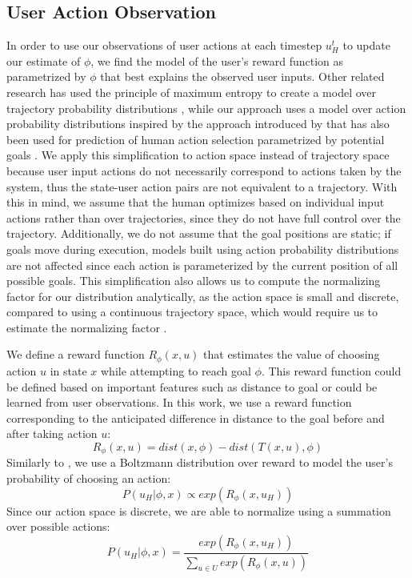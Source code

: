 \documentclass[conference]{IEEEtran}
\begin{document}
\subsection{User Action Observation}
In order to use our observations of user actions at each timestep $u_H^t$ to update our estimate of $\phi$, we find the model of the user's reward function as parametrized by $\phi$ that best explains the observed user inputs. Other related research has used the principle of maximum entropy \cite{ziebart2008maximum} to create a model over trajectory probability distributions \cite{dragan2012formalizing, javdani2015shared}, while our approach uses a model over action probability distributions inspired by the approach introduced by  \citet{ramachandran2007bayesian} that has also been used for prediction of human action selection parametrized by potential goals \cite{fisac2018probabilistically}. We apply this simplification to action space instead of trajectory space because user input actions do not necessarily correspond to actions taken by the system, thus the state-user action pairs are not equivalent to a trajectory. With this in mind, we assume that the human optimizes based on individual input actions rather than over trajectories, since they do not have full control over the trajectory. Additionally, we do not assume that the goal positions are static; if goals move during execution, models built using action probability distributions are not affected since each action is parameterized by the current position of all possible goals. This simplification also allows us to compute the normalizing factor for our distribution analytically, as the action space is small and discrete, compared to using a continuous trajectory space, which would require us to estimate the normalizing factor \cite{javdani2015shared}.

We define a reward function $R_\phi (x, u)$ that estimates the value of choosing action $u$ in state $x$ while attempting to reach goal $\phi$. This reward function could be defined based on important features such as distance to goal or could be learned from user observations. In this work, we use a reward function corresponding to the anticipated difference in distance to the goal before and after taking action $u$:
\[
R_\phi (x, u) = dist(x, \phi) - dist(T(x, u), \phi)
\]
Similarly to \citet{ramachandran2007bayesian}, we use a Boltzmann distribution over reward to model the user's probability of choosing an action:
\[
P(u_H|\phi, x) \propto exp(R_\phi (x, u_H))
\]
Since our action space is discrete, we are able to normalize using a summation over possible actions:
\[
P(u_H|\phi, x) = \frac{exp(R_\phi (x, u_H))}{\sum_{u \in U} exp(R_\phi (x, u))}
\]
\end{document}

